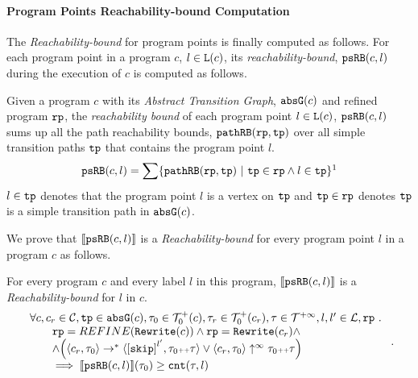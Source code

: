 \paragraph{Program Points Reachability-bound Computation}
\label{sec:point-psrb}
The \emph{Reachability-bound} for program points is finally computed as follows.
For each program point in a program $c$, $l \in \mathtt{L}(c)$,
its \emph{reachability-bound}, $\mathtt{psRB}(c, l)$ during the execution of $c$ is computed as follows.
%
\begin{defn}
\label{def:point_psrb}
Given a program $c$ with its \emph{Abstract Transition Graph}, $\mathtt{abs}{\mathtt{G}}(c)$ and refined program $\mathtt{rp}$,
the \emph{reachability bound} of each program point $l \in \mathtt{L}(c)$, $\mathtt{psRB}(c, l)$ 
sums up all the path reachability bounds, $\mathtt{pathRB}(\mathtt{rp}, \mathtt{tp})$ over all simple transition paths $\mathtt{tp}$ that contains the program point $l$.
\[ 
  \psRB(c, l) = 
  \sum
  \left\{ \inoutB(\rprog, \tpath) ~\vert~ \tpath \in \rprog \land 
  l \in \tpath \right\}\footnotemark
\]
$l \in \mathtt{tp}$ denotes that the program point $l$ is a vertex on $\mathtt{tp}$ 
and $\mathtt{tp} \in \mathtt{rp}$ denotes $\mathtt{tp}$ is a simple transition path in $\mathtt{abs}{\mathtt{G}}(c)$.
\end{defn}
We prove that $\llbracket \mathtt{psRB}(c, l) \rrbracket$ is a \emph{Reachability-bound} for every program point $l$ in a program $c$ as follows.
\begin{thm}
\label{thm:pathsensitive_rb_soundness}
For every program ${c}$ and every label $l$ in this program,
$\llbracket \mathtt{psRB}(c, l) \rrbracket$ is a \emph{Reachability-bound} for $l$ in $c$.
%
{\small
\[
  \begin{array}{l}
    \forall c, c_r \in \cdom, \tpath \in \absG(c), \trace_0 \in \ftdom_0(c),  \trace_r \in \ftdom_0(c_r), \trace \in \tdom, l, l' \in \ldom, \rprog \st 
    \\ \qquad
    \rprog = REFINE(\algrewrite(c))
    \land 
    \rprog = \algrewrite(c_r)
    \land
    \\ \qquad
    \land
    \Big(
    \config{c_r, \trace_0} \rightarrow^* \config{\clabel{\eskip}^{l'}, \trace_0 \tracecat \trace}
    \lor \config{c_r, \trace_0} \uparrow^{\infty} \trace_0 \tracecat \trace 
    \Big)
    \\ \qquad
    \implies \econfig{\psRB(c, l)}(\trace_0) \geq \counter(\trace, l)
  \end{array}.
\]
}
\end{thm}